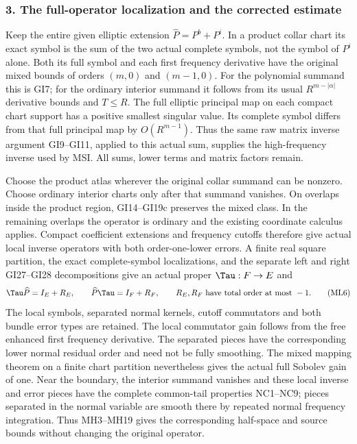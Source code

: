 \documentclass[
  11pt,
]{article}
\begin{document}
\subsubsection{3. The full-operator localization and the corrected
estimate}\label{the-full-operator-localization-and-the-corrected-estimate}

Keep the entire given elliptic extension \(\widehat P=P^b+P^i\). In a
product collar chart its exact symbol is the sum of the two actual
complete symbols, not the symbol of \(P^i\) alone. Both its full symbol
and each first frequency derivative have the original mixed bounds of
orders \((m,0)\) and \((m-1,0)\). For the polynomial summand this is
GI7; for the ordinary interior summand it follows from its usual
\(R^{m-|\alpha|}\) derivative bounds and \(T\leq R\). The full elliptic
principal map on each compact chart support has a positive smallest
singular value. Its complete symbol differs from that full principal map
by \(O(R^{m-1})\). Thus the same raw matrix inverse argument GI9--GI11,
applied to this actual sum, supplies the high-frequency inverse used by
MSI. All sums, lower terms and matrix factors remain.

Choose the product atlas wherever the original collar summand can be
nonzero. Choose ordinary interior charts only after that summand
vanishes. On overlaps inside the product region, GI14--GI19c preserves
the mixed class. In the remaining overlaps the operator is ordinary and
the existing coordinate calculus applies. Compact coefficient extensions
and frequency cutoffs therefore give actual local inverse operators with
both order-one-lower errors. A finite real square partition, the exact
complete-symbol localizations, and the separate left and right
GI27--GI28 decompositions give an actual proper \(\Tau:F\to E\) and \[
 \Tau\widehat P=I_E+R_E,
 \qquad\widehat P\Tau=I_F+R_F,
 \qquad R_E,R_F\text{ have total order at most }-1.
 \tag{ML6}
\] The local symbols, separated normal kernels, cutoff commutators and
both bundle error types are retained. The local commutator gain follows
from the free enhanced first frequency derivative. The separated pieces
have the corresponding lower normal residual order and need not be fully
smoothing. The mixed mapping theorem on a finite chart partition
nevertheless gives the actual full Sobolev gain of one. Near the
boundary, the interior summand vanishes and these local inverse and
error pieces have the complete common-tail properties NC1--NC9; pieces
separated in the normal variable are smooth there by repeated normal
frequency integration. Thus MH3--MH19 gives the corresponding half-space
and source bounds without changing the original operator.
\end{document}
